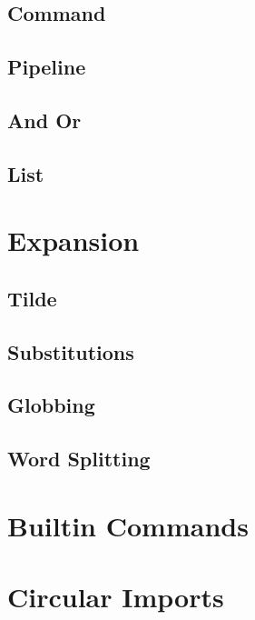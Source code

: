 \subsection{Command}
\subsection{Pipeline}
\subsection{And Or}
\subsection{List}

\section{Expansion}

\subsection{Tilde}
\subsection{Substitutions}
\subsection{Globbing}
\subsection{Word Splitting}

\section{Builtin Commands}

\section{Circular Imports}





